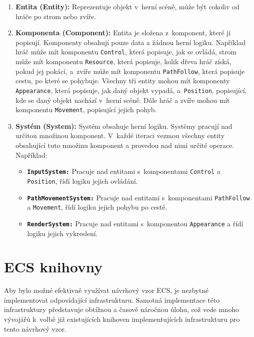 \begin{enumerate}
    \item \textbf{Entita (Entity):} Reprezentuje objekt v~herní scéně, může být cokoliv od hráče po strom nebo zvíře.

    \item \textbf{Komponenta (Component):} Entita je složena z~komponent, které ji popisují. Komponenty obsahují pouze data a žádnou herní logiku. Například hráč může mít komponentu \verb|Control|, která popisuje, jak se ovládá, strom může mít komponentu \verb|Resource|, která popisuje, kolik dřeva hráč získá, pokud jej pokácí, a~zvíře může mít komponentu \verb|PathFollow|, která popisuje cestu, po které se pohybuje. Všechny tři entity mohou mít komponenty \verb|Appearance|, která popisuje, jak daný objekt vypadá, a~\verb|Position|, popisující, kde se daný objekt nachází v~herní scéně. Dále hráč a zvíře mohou mít komponentu \verb|Movement|, popisující jejich pohyb.

    \item \textbf{Systém (System):} Systém obsahuje herní logiku. Systémy pracují nad určitou množinou komponent. V~každé iteraci vezmou všechny entity obsahující tuto množinu komponent a provedou nad nimi určité operace. Například:

    \begin{itemize}
        \item \textbf{\texttt{InputSystem:}} Pracuje nad entitami s~komponentami \verb|Control| a \verb|Position|, řídí logiku jejich ovládání.
        \item \textbf{\texttt{PathMovementSystem:}} Pracuje nad entitami s~komponentami \verb|PathFollow| a \verb|Movement|, řídí logiku jejich pohybu po cestě.
        \item \textbf{\texttt{RenderSystem:}} Pracuje nad entitami s~komponentou \verb|Appearance| a řídí logiku jejich vykreslení.
    \end{itemize}
\end{enumerate}


\section{ECS knihovny}
\label{sec:ecs-libs}
Aby bylo možné efektivně využívat návrhový vzor ECS, je nezbytné implementovat odpovídající infrastrukturu. Samotná implementace této infrastruktury představuje obtížnou a časově náročnou úlohu, což vede mnoho vývojářů k~volbě již existujících knihoven implementujících infrastrukturu pro tento návrhový vzor.

